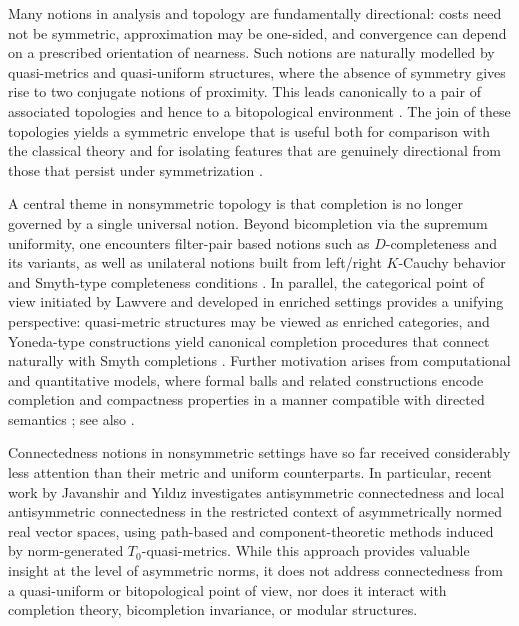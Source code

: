 \documentclass[preprint,12pt]{elsarticle}
\begin{document}
Many notions in analysis and topology are fundamentally directional:
costs need not be symmetric, approximation may be one-sided, and
convergence can depend on a prescribed orientation of nearness.
Such notions are naturally modelled by quasi-metrics and
quasi-uniform structures, where the absence of symmetry gives rise to
two conjugate notions of proximity.
This leads canonically to a pair of associated topologies and hence to a
bitopological environment
\cite{FletcherLindgren,Isbell1964,Kunzi2001,MarinRomaguera1998}.
The join of these topologies yields a symmetric envelope that is useful
both for comparison with the classical theory and for isolating features
that are genuinely directional from those that persist under
symmetrization \cite{Kelley,Willard}.

A central theme in nonsymmetric topology is that completion is no longer
governed by a single universal notion.
Beyond bicompletion via the supremum uniformity, one encounters
filter-pair based notions such as $D$-completeness and its variants, as
well as unilateral notions built from left/right $K$-Cauchy behavior and
Smyth-type completeness conditions
\cite{Doitchinov1991,FletcherLindgren,Kunzi2001}.
In parallel, the categorical point of view initiated by Lawvere and
developed in enriched settings provides a unifying perspective:
quasi-metric structures may be viewed as enriched categories, and
Yoneda-type constructions yield canonical completion procedures that
connect naturally with Smyth completions
\cite{Kelly1982,KunziSchellekens2002,Lawvere1973}.
Further motivation arises from computational and quantitative models,
where formal balls and related constructions encode completion and
compactness properties in a manner compatible with directed semantics
\cite{RomagueraTiradoValero2012,RomagueraValero2009,Rutten1998}; see also
\cite{FlaggSuenderhauf2002,Sunderhauf1998,Vickers1997}.

\medskip

Connectedness notions in nonsymmetric settings have so far received
considerably less attention than their metric and uniform counterparts.
In particular, recent work by Javanshir and Yıldız
\cite{JavanshirYildiz2023} investigates antisymmetric connectedness and
local antisymmetric connectedness in the restricted context of
asymmetrically normed real vector spaces, using path-based and
component-theoretic methods induced by norm-generated $T_0$-quasi-metrics.
While this approach provides valuable insight at the level of asymmetric
norms, it does not address connectedness from a quasi-uniform or
bitopological point of view, nor does it interact with completion theory,
bicompletion invariance, or modular structures.
\end{document}

